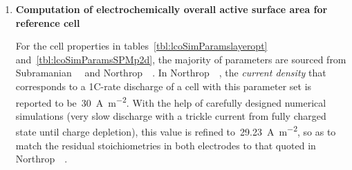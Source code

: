 \begin{enumerate}[ label=\textbf{\arabic*}), leftmargin=0pt, itemindent=20pt, labelwidth=15pt, labelsep=5pt, listparindent=0.7cm, align=left]
\begin{itemize}[ leftmargin=10pt, itemindent=15pt, labelwidth=5pt, labelsep=5pt, listparindent=0.7cm, align=left]
                In  this  layer  optimisation work,  following  the  assumptions
                of    \cref{subsec:layeroptassumptions},   the    overall   pack
                configuration remains  unchanged \ie~independent of  number of
                layers  within the  pouch.  This implies  that the  undervoltage
                threshold  for  DC  bus   voltage  throughout  this  work  shall
                remain  fixed  at~\SI{336}{\volt}.  Therefore,  with  96~series
                connected cells  in a string,  the lower cut-off voltage  for an
                individual  cell  is~\textbf{\SI{3.5}{\volt}}.  This  value  is
                reported  in \cref{tbl:lcoSimParamslayeropt}  and is  used as  a
                termination  condition  for  all  simulations  as  explained  in
                \cref{sec:layeroptframework}.

        \end{itemize}

    \item \textbf{Computation of electrochemically overall active surface area for reference cell}

        For   the  cell   properties  in   tables~\ref{tbl:lcoSimParamslayeropt}
        and~\ref{tbl:lcoSimParamsSPMp2d},    the    majority    of    parameters
        are      sourced      from      Subramanian~\etal~\cite{Subramanian2009}
        and                Northrop~\etal~\cite{Northrop2011}.                In
        Northrop~\etal~\cite{Northrop2011},  the   \emph{current  density}  that
        corresponds to a 1C-rate discharge of  a cell with this parameter set is
        reported to be~\approx\SI{30}{\ampere\per\meter\squared}. With the help
        of carefully designed numerical simulations  (very slow discharge with a
        trickle current from  fully charged state until  charge depletion), this
        value is refined to~\SI{29.23}{\ampere\per\meter\squared}, so as to
        match the residual stoichiometries in both electrodes to that quoted in
        Northrop~\etal~\cite{Northrop2011}.


\end{enumerate}
